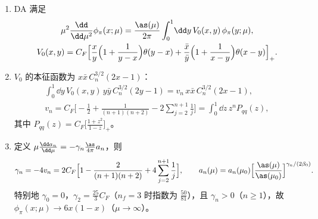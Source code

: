 \begin{theorem}[单圈 ERBL 演化]\tagR\label{thm:cex-erbl}
\begin{enumerate}[label=(\alph*)]
\item DA 满足
\begin{equation}\label{eq:cex-erbl}
\begin{gathered}
\mu^2\frac{\dd}{\dd\mu^2}\phi_\pi(x;\mu)=\frac{\as(\mu)}{2\pi}\int_0^1\!\dd y\,V_0(x,y)\,\phi_\pi(y;\mu),\\
V_0(x,y)=C_F\Big[\frac xy\Big(1+\frac1{y-x}\Big)\theta(y-x)+\frac{\bar x}{\bar y}\Big(1+\frac1{x-y}\Big)\theta(x-y)\Big]_+ .
\end{gathered}
\end{equation}
\item $V_0$ 的本征函数为 $x\bar x\,C^{3/2}_n(2x-1)$：
\begin{equation}\label{eq:cex-eigen}
\begin{gathered}
\int_0^1\!\dd y\,V_0(x,y)\,y\bar y\,C_n^{3/2}(2y-1)=v_n\,x\bar x\,C_n^{3/2}(2x-1),\\
v_n=C_F\Big[-\frac12+\frac{1}{(n+1)(n+2)}-2\sum_{j=2}^{n+1}\frac1j\Big]=\int_0^1\!\dd z\,z^n P_{qq}(z),
\end{gathered}
\end{equation}
其中 $P_{qq}(z)=C_F\big[\frac{1+z^2}{1-z}\big]_+$。
\item 定义 $\mu\frac{\dd a_n}{\dd\mu}=-\gamma_n\frac{\as}{4\pi}a_n$，则
\begin{equation}\label{eq:cex-gamman}
\gamma_n=-4v_n=2C_F\Big[1-\frac{2}{(n+1)(n+2)}+4\sum_{j=2}^{n+1}\frac1j\Big],\qquad
a_n(\mu)=a_n(\mu_0)\Big[\frac{\as(\mu)}{\as(\mu_0)}\Big]^{\gamma_n/(2\beta_0)} .
\end{equation}
特别地 $\gamma_0=0$，$\gamma_2=\frac{25}{3}C_F$（$n_f=3$ 时指数为 $\frac{50}{81}$），且 $\gamma_n>0$（$n\ge1$），故 $\phi_\pi(x;\mu)\to6x(1-x)$（$\mu\to\infty$）。
\end{enumerate}
\end{theorem}

